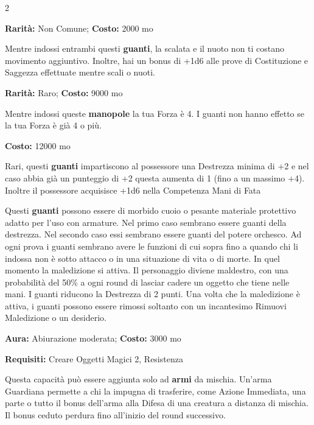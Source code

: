\begin{multicols}{2}

\textbf{Rarità:} Non Comune; \textbf{Costo:} 2000 mo

Mentre indossi entrambi questi \textbf{guanti}, la scalata e il nuoto non ti costano movimento aggiuntivo. Inoltre, hai un bonus di +1d6 alle prove di Costituzione e Saggezza effettuate mentre scali o nuoti.


\textbf{Rarità:} Raro; \textbf{Costo:} 9000 mo

Mentre indossi queste \textbf{manopole} la tua Forza è 4. I guanti non hanno effetto se la tua Forza è già 4 o più.


\textbf{Costo:} 12000 mo

Rari, questi \textbf{guanti} impartiscono al possessore una Destrezza minima di +2 e nel caso abbia già un punteggio di +2 questa aumenta di 1 (fino a un massimo +4). Inoltre il possessore acquisisce +1d6 nella Competenza Mani di Fata


Questi \textbf{guanti} possono essere di morbido cuoio o pesante materiale protettivo adatto per l'uso con armature. Nel primo caso sembrano essere guanti della destrezza. Nel secondo caso essi sembrano essere guanti del potere orchesco. Ad ogni prova i guanti sembrano avere le funzioni di cui sopra fino a quando chi li indossa non è sotto attacco o in una situazione di vita o di morte. In quel momento la maledizione si attiva. Il personaggio diviene maldestro, con una probabilità del 50\% a ogni round di lasciar cadere un oggetto che tiene nelle mani. I guanti riducono la Destrezza di 2 punti. Una volta che la maledizione è attiva, i guanti possono essere rimossi soltanto con un incantesimo Rimuovi Maledizione o un desiderio.


\textbf{Aura:} Abiurazione moderata; \textbf{Costo:} 3000 mo

\textbf{Requisiti:} Creare Oggetti Magici 2, Resistenza

Questa capacità può essere aggiunta solo ad \textbf{armi} da mischia. Un'arma Guardiana permette a chi la impugna di trasferire, come Azione Immediata, una parte o tutto il bonus dell'arma alla Difesa di una creatura a distanza di mischia. Il bonus ceduto perdura fino all'inizio del round successivo.


\end{multicols}
